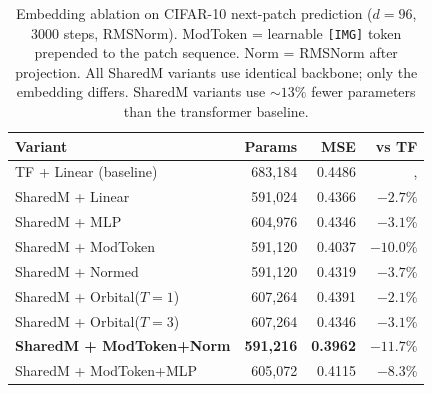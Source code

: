 \documentclass[11pt, a4paper]{article}
\theoremstyle{plain}
\theoremstyle{remark}
\begin{document}
\begin{table}[h]
\centering
\small
\begin{tabular}{@{}lrrr@{}}
\toprule
\textbf{Variant} & \textbf{Params} & \textbf{MSE} & \textbf{vs TF} \\
\midrule
TF + Linear (baseline)      & 683,184  & 0.4486 & ,       \\
\midrule
SharedM + Linear             & 591,024  & 0.4366 & $-2.7\%$ \\
SharedM + MLP                & 604,976  & 0.4346 & $-3.1\%$ \\
SharedM + ModToken           & 591,120  & 0.4037 & $-10.0\%$ \\
SharedM + Normed             & 591,120  & 0.4319 & $-3.7\%$ \\
SharedM + Orbital($T{=}1$)  & 607,264  & 0.4391 & $-2.1\%$ \\
SharedM + Orbital($T{=}3$)  & 607,264  & 0.4346 & $-3.1\%$ \\
\textbf{SharedM + ModToken+Norm} & \textbf{591,216} & \textbf{0.3962} & $\mathbf{-11.7\%}$ \\
SharedM + ModToken+MLP      & 605,072  & 0.4115 & $-8.3\%$ \\
\bottomrule
\end{tabular}
\caption{Embedding ablation on CIFAR-10 next-patch prediction ($d{=}96$, 3000 steps, RMSNorm).  ModToken = learnable \texttt{[IMG]} token prepended to the patch sequence.  Norm = RMSNorm after projection.  All SharedM variants use identical backbone; only the embedding differs.  SharedM variants use ${\sim}13\%$ fewer parameters than the transformer baseline.}
\label{tab:embedding-ablation}
\end{table}
\end{document}
